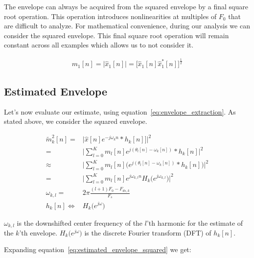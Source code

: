 \documentclass [11pt, proquest] {uwthesis}[2015/03/03]
\begin{document}
The envelope can always be acquired from the squared envelope by a final square root operation.  This operation introduces nonlinearities at multiples of $F_0$ that are difficult to analyze.  For mathematical convenience, during our analysis we can consider the squared envelope.  This final square root operation will remain constant across all examples which allows us to not consider it.

\begin{align}
\label{eq:square_root_relationship}
m_1[n] = \Big|\widehat{x}_1[n]\Big| = \Big[ \widehat{x}_1[n] \widehat{x}_1^*[n] \Big]^\frac{1}{2}
\end{align}

\subsection{Estimated Envelope}

Let's now evaluate our estimate, using equation~\ref{eq:envelope_extraction}.  As stated above, we consider the squared envelope.

\begin{align}
\tilde{m}_k^2[n] =& \Big| \widehat{x}[n]e^{-j \omega_kn} * h_k[n]]  \Big|^2 \nonumber \\
%
=& \Bigg|  \sum\limits_{l=0}^K m_l[n]e^{j(\theta_l[n] - \omega_k[n])}*h_k[n] \Bigg|^2 \nonumber \\
%
\approx& \Bigg|  \sum\limits_{l=0}^K m_l[n] \Big(e^{j(\theta_l[n] - \omega_k[n])}*h_k[n] \Big) \Bigg|^2 \nonumber \\
%
\label{eq:estimated_envelope_squared}
=& \Bigg|  \sum\limits_{l=0}^K m_l[n] e^{j\omega_{k,l}n} H_k\big(e^{j\omega_{k,l}}\big) \Bigg|^2 \\
%
\label{eq:downshift_radian_frequency}
\omega_{k,l} =& 2\pi\frac{(l+1)F_0 - F_{ds,k}}{F_s} \\
%
h_k[n] \Longleftrightarrow& H_k\big(e^{j\omega}\big)
\end{align}

$\omega_{k,l}$ is the downshifted center frequency of the $l$'th harmonic for the estimate of the $k$'th envelope.  $H_k\big(e^{j\omega}\big)$ is the discrete Fourier transform (DFT) of $h_k[n]$.

Expanding equation~\ref{eq:estimated_envelope_squared} we get:
\end{document}
